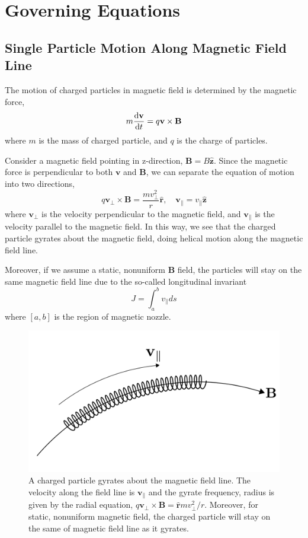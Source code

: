 \chapter{Governing Equations} \label{chap:governing_equations}
\section{Single Particle Motion Along Magnetic Field Line}
The motion of charged particles in magnetic field is determined by the magnetic force,
\[ m\dv{\mathbf{v}}{t} = q\mathbf{v\times B} \]
where $m$ is the mass of charged particle, and $q$ is the charge of particles.

Consider a magnetic field pointing in z-direction, $\mathbf{B}=B\mathbf{\hat{z}}$. Since the magnetic force is perpendicular to both $\mathbf{v}$ and $\mathbf{B}$, we can separate the equation of motion into two directions,
\[ 
q\mathbf{v_{\perp}\times B} = \frac{mv_{\perp}^2}{r}\mathbf{\hat{r}}, 
\quad
\mathbf{v}_{\parallel} = v_{\parallel} \mathbf{\hat{z}} \]
where $\mathbf{v}_{\perp}$ is the velocity perpendicular to the magnetic field, and $\mathbf{v}_{\parallel}$ is the velocity parallel to the magnetic field. In this way, we see that the charged particle gyrates about the magnetic field, doing helical motion along the magnetic field line. 

Moreover, if we assume a static, nonuniform $\mathbf{B}$ field, the particles will stay on the same magnetic field line due to the so-called longitudinal invariant 
\[J = \int_{a}^{b} v_{\parallel} ds\]
where $[a,b]$ is the region of magnetic nozzle.  
\begin{figure}[H]
	\centering
	\includegraphics[width=0.7\linewidth]{img/governing_equations/gyrate_along_b_field}
	\caption{A charged particle gyrates about the magnetic field line. The velocity along the field line is $\mathbf{v}_{\parallel}$ and the gyrate frequency, radius is given by the radial equation, $q\mathbf{v_{\perp}\times B} = \mathbf{\hat{r}} mv_\perp^2/r$. Moreover, for static, nonuniform magnetic field, the charged particle will stay on the same of magnetic field line as it gyrates.}
	\label{fig:gyrate-along-b-field}
\end{figure}


